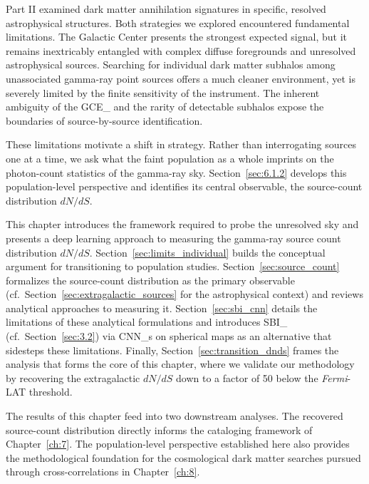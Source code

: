 
Part II examined dark matter annihilation signatures in specific, resolved astrophysical structures.
Both strategies we explored encountered fundamental limitations.
The Galactic Center presents the strongest expected signal, but it remains inextricably entangled with complex diffuse foregrounds and unresolved astrophysical sources.
Searching for individual dark matter subhalos among unassociated gamma-ray point sources offers a much cleaner environment, yet is severely limited by the finite sensitivity of the instrument.
The inherent ambiguity of the \gls{GCE_} and the rarity of detectable subhalos expose the boundaries of source-by-source identification.

These limitations motivate a shift in strategy.
Rather than interrogating sources one at a time, we ask what the faint population as a whole imprints on the photon-count statistics of the gamma-ray sky. Section~\ref{sec:6.1.2} develops this population-level perspective and identifies its central observable, the source-count distribution $dN/dS$.

This chapter introduces the framework required to probe the unresolved sky and presents a deep learning approach to measuring the gamma-ray source count distribution $dN/dS$.
Section~\ref{sec:limits_individual} builds the conceptual argument for transitioning to population studies. Section~\ref{sec:source_count} formalizes the source-count distribution as the primary observable (cf.\ Section~\ref{sec:extragalactic_sources} for the astrophysical context) and reviews analytical approaches to measuring it. Section~\ref{sec:sbi_cnn} details the limitations of these analytical formulations and introduces \gls{SBI_} (cf.\ Section~\ref{sec:3.2}) via \glspl{CNN_} on spherical maps as an alternative that sidesteps these limitations. Finally, Section~\ref{sec:transition_dnds} frames the analysis that forms the core of this chapter, where we validate our methodology by recovering the extragalactic $dN/dS$ down to a factor of 50 below the \textit{Fermi}-LAT threshold.

The results of this chapter feed into two downstream analyses.
The recovered source-count distribution directly informs the cataloging framework of Chapter~\ref{ch:7}.
The population-level perspective established here also provides the methodological foundation for the cosmological dark matter searches pursued through cross-correlations in Chapter~\ref{ch:8}.
